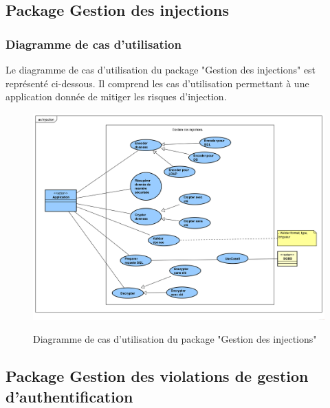 \subsection{Package Gestion des injections}

\subsubsection{Diagramme de cas d'utilisation}
Le diagramme de cas d'utilisation du package "Gestion des injections" est représenté ci-dessous. Il comprend les cas d'utilisation permettant à une application donnée de mitiger les risques d'injection.\\ 
\begin{figure}[H]
	\centering
	\begin{minipage}{18cm}
		{\includegraphics[width=1\textwidth, height=0.4\textheight]{fig/Injection-use-case-diagram.png}}
	\end{minipage}
	\caption{Diagramme de cas d'utilisation du package "Gestion des injections"}
	\label{fig:7.2}
\end{figure}

\subsection{Package Gestion des violations de gestion d'authentification}

